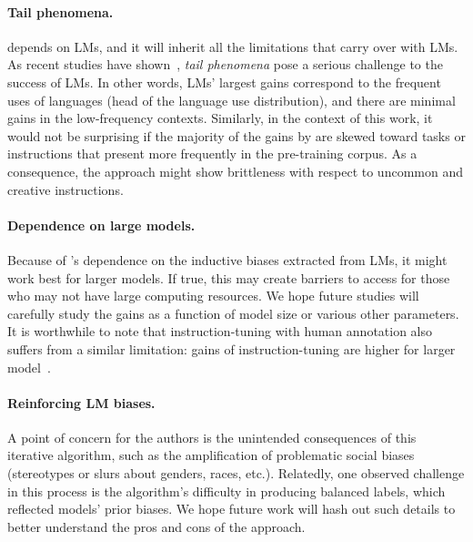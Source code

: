 \paragraph{Tail phenomena.} 
\name{} depends on LMs, and it will inherit all the limitations that carry over with LMs. 
As recent studies have shown~\cite{razeghi2022impact,kandpal2022large},  \emph{tail phenomena} pose a serious challenge to the success of LMs. In other words, LMs' largest gains correspond to the frequent uses of languages (head of the language use distribution), and there are minimal gains in the low-frequency contexts. 
Similarly, in the context of this work, it would not be surprising if the majority of the gains by \name{} are skewed toward 
tasks or instructions that present more frequently in the pre-training corpus. 
As a consequence, the approach might show brittleness with respect to uncommon and creative instructions.



\paragraph{Dependence on large models.} 
Because of \name's dependence on the inductive biases extracted from LMs, it might work best for larger models. 
If true, this may create barriers to access for those who may not have large computing resources. 
We hope future studies will carefully study the gains as a function of model size or various other parameters. 
It is worthwhile to note that instruction-tuning with human annotation also suffers from a similar limitation: gains of instruction-tuning are higher for larger model~\cite{wei2022finetuned}. 

\paragraph{Reinforcing LM biases.}
A point of concern for the authors is the unintended consequences of this iterative algorithm, such as the amplification of problematic social biases (stereotypes or slurs about genders, races, etc.). 
Relatedly, one observed challenge in this process is the algorithm's difficulty in producing balanced labels, which reflected models' prior biases. 
We hope future work will hash out such details to better understand the pros and cons of the approach. 


